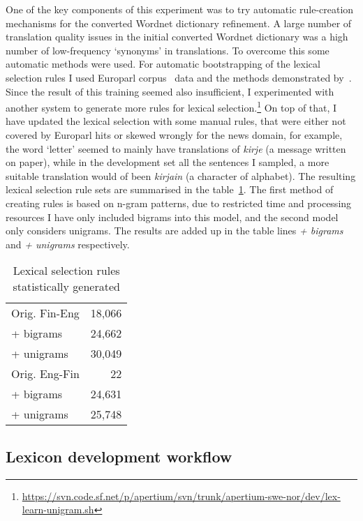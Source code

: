\documentclass[free]{flammie}
\begin{document}
One of the key components of this experiment was to try automatic rule-creation
mechanisms for the converted Wordnet dictionary refinement.  A large number of
translation quality issues in the initial converted Wordnet dictionary was a
high number of low-frequency `synonyms' in translations. To overcome this some
automatic methods were used. For automatic bootstrapping of the lexical
selection rules I used Europarl corpus~\cite{koehn2005europarl} data and the
methods demonstrated by~\cite{tyers2012flexible}.  Since the result of this
training seemed also insufficient, I experimented with another system to
generate more rules for lexical
selection.\footnote{\url{https://svn.code.sf.net/p/apertium/svn/trunk/apertium-swe-nor/dev/lex-learn-unigram.sh}}
On top of that, I have updated the lexical selection with some manual rules,
that were either not covered by Europarl hits or skewed wrongly for the news
domain, for example, the word `letter' seemed to mainly have translations of
\textit{kirje} (a message written on paper), while in the development set all
the sentences I sampled, a more suitable translation would of been
\textit{kirjain} (a character of alphabet).  The resulting lexical selection
rule sets are summarised in the table~\ref{table:lexical-selection}. The first
method of creating rules is based on n-gram patterns, due to restricted time and
processing resources I have only included bigrams into this model, and the
second model only considers unigrams.  The results are added up in the table
lines \textit{+ bigrams} and \textit{+ unigrams} respectively.

\begin{table}
\begin{center}
    \begin{tabular}{lr}
        \toprule
        Orig. Fin-Eng & 18,066 \\
        + bigrams &     24,662\\
        + unigrams &    30,049 \\
        \midrule
        Orig. Eng-Fin & 22 \\
        + bigrams & 24,631 \\
        + unigrams & 25,748 \\
        \bottomrule
    \end{tabular}
    \caption{Lexical selection rules statistically generated\label{table:lexical-selection}}
\end{center}
\end{table}


\subsection{Lexicon development workflow}
\label{sec:lexicon-development}
\end{document}
